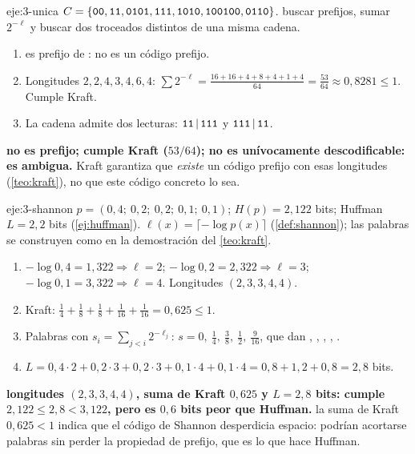 \begin{solucion}{eje:3-unica}
\datos $C=\{\textnormal{\texttt{00}},\textnormal{\texttt{11}},\textnormal{\texttt{0101}},\textnormal{\texttt{111}},\textnormal{\texttt{1010}},\textnormal{\texttt{100100}},\textnormal{\texttt{0110}}\}$.
\planteamiento buscar prefijos, sumar $2^{-\ell}$ y buscar dos troceados distintos de una misma cadena.
\pasos
\begin{enumerate}[label=\arabic*.]
  \item {} es prefijo de : no es un código prefijo.
  \item Longitudes $2,2,4,3,4,6,4$: $\sum2^{-\ell}=\frac{16+16+4+8+4+1+4}{64}=\frac{53}{64}\approx 0{,}8281\le 1$. Cumple Kraft.
  \item La cadena  admite dos lecturas: $\textnormal{\texttt{11}}\,|\,\textnormal{\texttt{111}}$ y $\textnormal{\texttt{111}}\,|\,\textnormal{\texttt{11}}$.
\end{enumerate}
\resultado \textbf{no es prefijo; cumple Kraft ($53/64$); no es unívocamente descodificable:  es ambigua.}
\comprobacion Kraft garantiza que \emph{existe} un código prefijo con esas longitudes (\cref{teo:kraft}), no que este código concreto lo sea.
\end{solucion}

\begin{solucion}{eje:3-shannon}
\datos $p=(0{,}4;\ 0{,}2;\ 0{,}2;\ 0{,}1;\ 0{,}1)$; $H(p)=2{,}122$ bits; Huffman $L=2{,}2$ bits (\cref{ej:huffman}).
\planteamiento $\ell(x)=\lceil-\log p(x)\rceil$ (\cref{def:shannon}); las palabras se construyen como en la demostración del \cref{teo:kraft}.
\pasos
\begin{enumerate}[label=\arabic*.]
  \item $-\log 0{,}4=1{,}322\Rightarrow\ell=2$; $-\log 0{,}2=2{,}322\Rightarrow\ell=3$; $-\log 0{,}1=3{,}322\Rightarrow\ell=4$. Longitudes $(2,3,3,4,4)$.
  \item Kraft: $\frac14+\frac18+\frac18+\frac1{16}+\frac1{16}=0{,}625\le 1$.
  \item Palabras con $s_i=\sum_{j<i}2^{-\ell_j}$: $s=0,\ \tfrac14,\ \tfrac38,\ \tfrac12,\ \tfrac9{16}$, que dan , , , , .
  \item $L=0{,}4\cdot 2+0{,}2\cdot 3+0{,}2\cdot 3+0{,}1\cdot 4+0{,}1\cdot 4=0{,}8+1{,}2+0{,}8=2{,}8$ bits.
\end{enumerate}
\resultado \textbf{longitudes $(2,3,3,4,4)$, suma de Kraft $0{,}625$ y $L=2{,}8$ bits: cumple $2{,}122\le 2{,}8<3{,}122$, pero es $0{,}6$ bits peor que Huffman.}
\comprobacion la suma de Kraft $0{,}625<1$ indica que el código de Shannon desperdicia espacio: podrían acortarse palabras sin perder la propiedad de prefijo, que es lo que hace Huffman.
\end{solucion}

